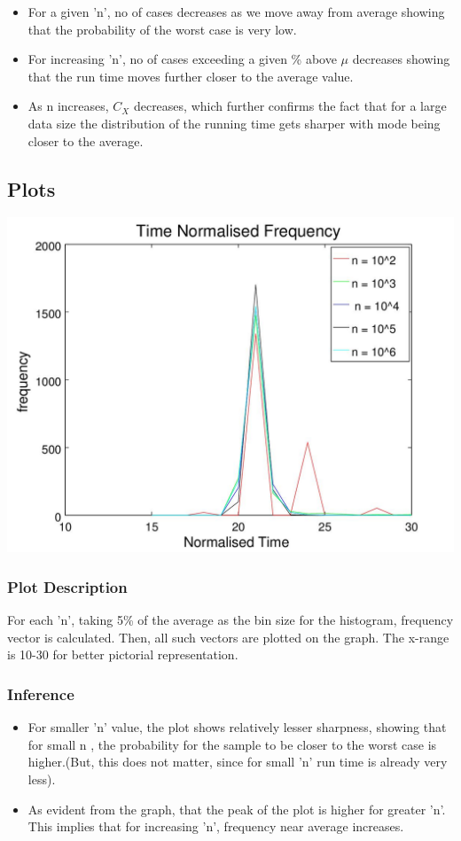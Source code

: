 \documentclass{article}
\begin{document}
\begin{itemize}
\item For a given 'n', no of cases decreases as we move away from average showing that the probability of the worst case is very low.
\item For increasing 'n', no of cases exceeding a given \% above $\mu$ decreases showing that the run time moves further closer to the average value.
\item As n increases, $C_{X}$ decreases, which further confirms the fact that for a large data size the distribution of the running time gets sharper with mode being closer to the average.
\end{itemize}
    
\subsection{Plots}
\includegraphics[width=1\columnwidth]{plot2.jpg}\\

\subsubsection{Plot Description}
For each 'n', taking 5\% of the average as the bin size for the histogram, frequency vector is calculated. Then, all such vectors are plotted on the graph.
The x-range is 10-30 for better pictorial representation.
\subsubsection{Inference}
\begin{itemize}
\item For smaller 'n' value, the plot shows relatively lesser sharpness, showing that for small n , the probability for the sample to be closer to the worst case is higher.(But, this does not matter, since for small 'n' run time is already very less).
\item As evident from the graph, that the peak of the plot is higher for greater 'n'. This implies that for increasing 'n', frequency near average increases.
\end{itemize}
\end{document}
